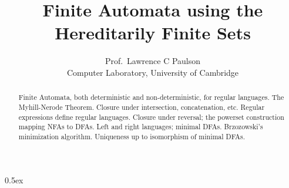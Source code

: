 \documentclass[11pt,a4paper]{article}
\date{}
\begin{document}
\title{Finite Automata using the Hereditarily Finite Sets}
\author{Prof.\ Lawrence C Paulson\\
        Computer Laboratory, University of Cambridge}
\maketitle
\parindent 0pt\parskip 0.5ex

\begin{abstract}
Finite Automata, both deterministic and non-deterministic, for regular languages.
  The Myhill-Nerode Theorem. Closure under intersection, concatenation, etc.
  Regular expressions define regular languages. Closure under reversal;
  the powerset construction mapping NFAs to DFAs. Left and right languages; minimal DFAs.
  Brzozowski's minimization algorithm. Uniqueness up to isomorphism of minimal DFAs.	
\end{abstract}



\end{document}
